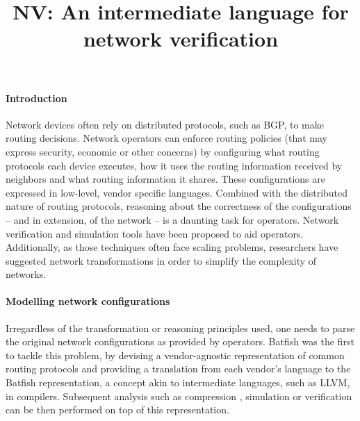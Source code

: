 \documentclass[sigconf,10pt]{acmart}
\begin{document}
\title{NV: An intermediate language for network verification}


\maketitle

%
%
%
%

\paragraph{Introduction} 

Network devices often rely on distributed protocols, such as BGP, to
make routing decisions. Network operators can enforce routing policies
(that may express security, economic or other concerns) by configuring
what routing protocols each device executes, how it uses the routing
information received by neighbors and what routing information it
shares. These configurations are expressed in low-level, vendor
specific languages. Combined with the distributed nature of routing
protocols, reasoning about the correctness of the configurations --
and in extension, of the network -- is a daunting task for operators.
Network verification \cite{minesweeper,arc} and simulation tools
\cite{batfish} have been proposed to aid operators. Additionally, as
those techniques often face scaling problems, researchers have
suggested network transformations \cite{bonsai, origami} in order to
simplify the complexity of networks.

\paragraph{Modelling network configurations}
Irregardless of the transformation or reasoning principles used, one
needs to parse the original network configurations as provided by
operators. Batfish \cite{batfish} was the first to tackle this
problem, by devising a vendor-agnostic representation of common
routing protocols and providing a translation from each vendor's
language to the Batfish representation, a concept akin to intermediate
languages, such as LLVM, in compilers. Subsequent analysis such as
compression \cite{bonsai}, simulation \cite{batfish} or verification
\cite{minesweeper,arc} can be then performed on top of this
representation.
\end{document}
